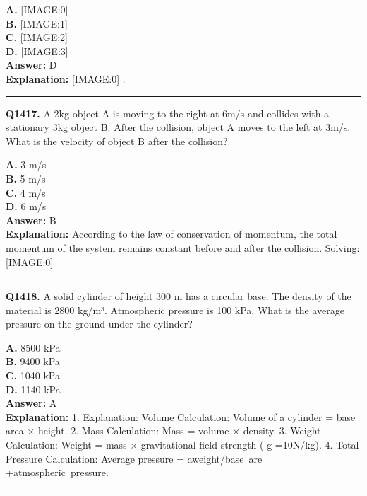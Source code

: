 \documentclass[12pt]{article}
\begin{document}
\textbf{A.} [IMAGE:0] \\
\textbf{B.} [IMAGE:1] \\
\textbf{C.} [IMAGE:2] \\
\textbf{D.} [IMAGE:3] \\

\textbf{Answer:} D \\
\textbf{Explanation:} [IMAGE:0]
.

\hrule
\vspace{1em}


\noindent
\textbf{Q1417.} A 2kg object A is moving to the right at 6m/s and collides with a stationary 3kg object B. After the collision, object A moves to the left at 3m/s. What is the velocity of object B after the collision?



\textbf{A.} 3 m/s \\
\textbf{B.} 5 m/s \\
\textbf{C.} 4 m/s \\
\textbf{D.} 6 m/s \\

\textbf{Answer:} B \\
\textbf{Explanation:} According to the law of conservation of momentum, the total momentum of the system remains constant before and after the collision.
Solving:
[IMAGE:0]

\hrule
\vspace{1em}


\noindent
\textbf{Q1418.} A solid cylinder of height 300 m has a circular base. The density of the material is 2800 kg/m³. Atmospheric pressure is 100 kPa. What is the average pressure on the ground under the cylinder?



\textbf{A.} 8500 kPa \\
\textbf{B.} 9400 kPa \\
\textbf{C.} 1040 kPa \\
\textbf{D.} 1140 kPa \\

\textbf{Answer:} A \\
\textbf{Explanation:} 1.
Explanation:
Volume Calculation: Volume of a cylinder = base area × height.
2.
Mass Calculation: Mass = volume × density.
3.
Weight Calculation: Weight = mass × gravitational field strength (
g
=10N/kg).
4.
Total Pressure Calculation: Average pressure = aweight/base are
​
+atmospheric pressure.

\hrule
\vspace{1em}
\end{document}
